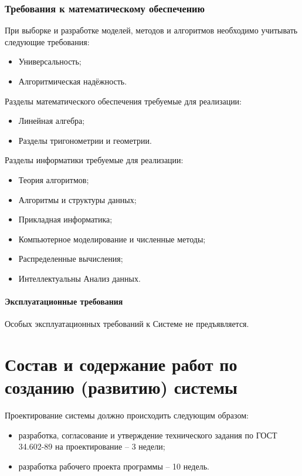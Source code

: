 \subsection{Требования к математическому обеспечению}
При выборке и разработке моделей, методов и алгоритмов необходимо учитывать следующие требования:
\begin{itemize}
    \item Универсальность;
    \item Алгоритмическая надёжность.
\end{itemize}

Разделы математического обеспечения требуемые для реализации:
\begin{itemize}
    \item Линейная алгебра;
    \item Разделы тригонометрии и геометрии.
\end{itemize}

Разделы информатики требуемые для реализации:
\begin{itemize}
    \item Теория алгоритмов;
    \item Алгоритмы и структуры данных;
    \item Прикладная информатика;
    \item Компьютерное моделирование и численные методы;
    \item Распределенные вычисления;
    \item Интеллектуальны Анализ данных.
\end{itemize}

\subsubsection{Эксплуатационные требования}
Особых эксплуатационных требований к Системе не предъявляется.

\chapter{Состав и содержание работ по созданию (развитию) системы}
Проектирование системы должно происходить следующим образом:
\begin{itemize}
    \item разработка, согласование и утверждение технического задания по ГОСТ 34.602-89 на 
        проектирование -- 3 недели;
    \item разработка рабочего проекта программы -- 10 недель.
\end{itemize}

